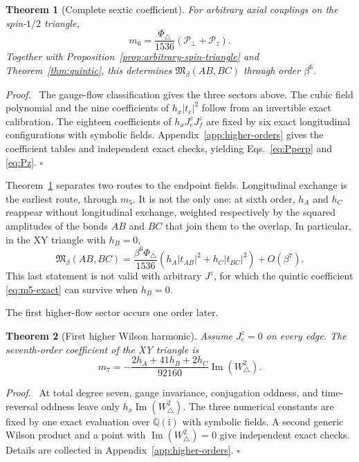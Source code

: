 \documentclass[aps,prb,preprint,nofootinbib,longbibliography]{revtex4-2}
\newcommand{\Mmod}{\mathfrak{M}}
\newcommand{\ii}{\mathrm{i}}
\newcommand{\PhiTri}{\Phi_\triangle}
\newtheorem{theorem}{Theorem}
\newenvironment{proof}{\par\noindent\textit{Proof.}\ }%
{\unskip\nobreak\hfill\(\square\)\par}
\begin{document}
\begin{theorem}[Complete sextic coefficient]
\label{thm:sextic}
For arbitrary axial couplings on the spin-$1/2$ triangle,
\begin{equation}
 m_6=\frac{\PhiTri}{1536}\left(\mathcal P_\perp+\mathcal P_z\right).
 \label{eq:m6-exact}
\end{equation}
Together with Proposition~\ref{prop:arbitrary-spin-triangle} and
Theorem~\ref{thm:quintic}, this
determines $\Mmod_\beta(AB,BC)$ through order $\beta^6$.
\end{theorem}

\begin{proof}
The gauge-flow classification gives the three sectors above.  The cubic
field polynomial and the nine coefficients of $h_x|t_e|^2$ follow from an
invertible exact calibration.  The eighteen coefficients of
$h_xJ_e^zJ_f^z$ are fixed by six exact longitudinal configurations with
symbolic fields.  Appendix~\ref{app:higher-orders} gives the coefficient
tables and independent exact checks, yielding Eqs.~\eqref{eq:Pperp} and
\eqref{eq:Pz}.
\end{proof}

Theorem~\ref{thm:sextic} separates two routes to the endpoint fields.
Longitudinal exchange is the earliest route, through $m_5$.  It is not the
only one: at sixth order, $h_A$ and $h_C$ reappear without longitudinal
exchange, weighted respectively by the squared amplitudes of the bonds $AB$
and $BC$ that join them to the overlap.  In particular, in the XY triangle
with $h_B=0$,
\begin{equation}
 \Mmod_\beta(AB,BC)
 =\frac{\beta^6\PhiTri}{1536}
 \left(h_A|t_{AB}|^2+h_C|t_{BC}|^2\right)+O(\beta^7).
 \label{eq:hB-zero-transverse}
\end{equation}
This last statement is not valid with arbitrary $J^z$, for which the quintic
coefficient \eqref{eq:m5-exact} can survive when $h_B=0$.

The first higher-flow sector occurs one order later.

\begin{theorem}[First higher Wilson harmonic]
\label{thm:septic}
Assume $J_e^z=0$ on every edge.  The seventh-order coefficient of the XY
triangle is
\begin{equation}
 m_7=-\frac{2h_A+41h_B+2h_C}{92160}
       \operatorname{Im}(W_\triangle^2).
 \label{eq:m7-exact}
\end{equation}
\end{theorem}

\begin{proof}
At total degree seven, gauge invariance, conjugation oddness, and time-reversal
oddness leave only $h_x\operatorname{Im}(W_\triangle^2)$.  The three numerical
constants are fixed by one exact evaluation over $\mathbb Q(\ii)$ with symbolic
fields.  A second generic Wilson product and a point with
$\operatorname{Im}(W_\triangle^2)=0$ give independent exact checks.  Details
are collected in Appendix~\ref{app:higher-orders}.
\end{proof}
\end{document}
